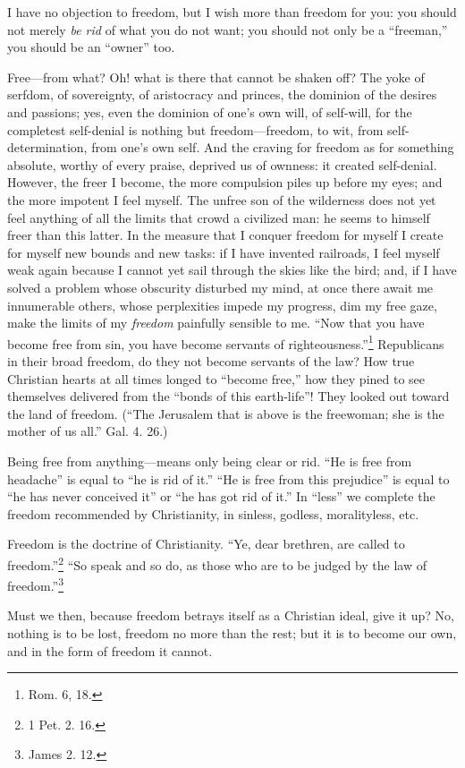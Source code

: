 I have no objection to freedom, but I wish more than freedom for you: you 
should not merely \textit{be rid} of what you do not want; you should not only 
be a ``freeman,'' you should be an ``owner'' too.

Free---from what? Oh! what is there that cannot be shaken off? The yoke of 
serfdom, of sovereignty, of aristocracy and princes, the dominion of the 
desires and passions; yes, even the dominion of one's own will, of self-will, 
for the completest self-denial is nothing but freedom---freedom, to wit, from 
self-determination, from one's own self. And the craving for freedom as for 
something absolute, worthy of every praise, deprived us of ownness: it created 
self-denial. However, the freer I become, the more compulsion piles up before 
my eyes; and the more impotent I feel myself. The unfree son of the wilderness 
does not yet feel anything of all the limits that crowd a civilized man: he 
seems to himself freer than this latter. In the measure that I conquer freedom 
for myself I create for myself new bounds and new tasks: if I have invented 
railroads, I feel myself weak again because I cannot yet sail through the 
skies like the bird; and, if I have solved a problem whose obscurity disturbed 
my mind, at once there await me innumerable others, whose perplexities impede 
my progress, dim my free gaze, make the limits of my \textit{freedom} 
painfully sensible to me. ``Now that you have become free from sin, you have 
become servants of righteousness.''\footnote{Rom. 6, 18.} Republicans in 
their broad freedom, do they not become servants of the law? How true 
Christian hearts at all times longed to ``become free,'' how they pined to 
see themselves delivered from the ``bonds of this earth-life''! They looked 
out toward the land of freedom. (``The Jerusalem that is above is the 
freewoman; she is the mother of us all.'' Gal. 4. 26.)

Being free from anything---means only being clear or rid. ``He is free from 
headache'' is equal to ``he is rid of it.'' ``He is free from this 
prejudice'' is equal to ``he has never conceived it'' or ``he has got rid 
of it.'' In ``less'' we complete the freedom recommended by Christianity, 
in sinless, godless, moralityless, etc.

 Freedom is the doctrine of Christianity. ``Ye, dear brethren, are called to 
freedom.''\footnote{1 Pet. 2. 16.} ``So speak and so do, as those who are to 
be judged by the law of freedom.''\footnote{James 2. 12.}

Must we then, because freedom betrays itself as a Christian ideal, give it up? 
No, nothing is to be lost, freedom no more than the rest; but it is to become 
our own, and in the form of freedom it cannot.

